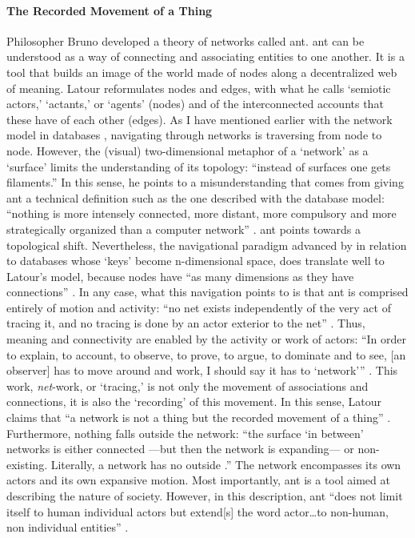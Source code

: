 \paragraph{The Recorded Movement of a Thing}
Philosopher Bruno \textcite{Lat90:On, Lat93:We} developed a theory of networks called \gls{ant}. \gls{ant} can be understood as a way of connecting and associating entities to one another. It is a tool that builds an image of the world made of nodes along a decentralized web of meaning. Latour reformulates nodes and edges, with what he calls `semiotic actors,' `actants,' or `agents' (nodes) and of the interconnected accounts that these have of each other (edges). As I have mentioned earlier with the network model in databases , navigating through networks is traversing from node to node. However, the (visual) two-dimensional metaphor of a `network' as a `surface' limits the understanding of its topology: ``instead of surfaces one gets filaments.'' \parencite[3]{Lat90:On} In this sense, he points to a misunderstanding that comes from giving \gls{ant} a technical definition such as the one described with the database model: ``nothing is more intensely connected, more distant, more compulsory and more strategically organized than a computer network'' \parencite[2]{Lat90:On}. \gls{ant} points towards a topological shift. Nevertheless, the navigational paradigm advanced by \textcite{Bachman:1973:PN:355611.362534} in relation to databases whose `keys' become n-dimensional space, does translate well to Latour's model, because nodes have ``as many dimensions as they have connections'' \parencite[3]{Lat90:On}. In any case, what this navigation points to is that \gls{ant} is comprised entirely of motion and activity: ``no net exists independently of the very act of tracing it, and no tracing is done by an actor exterior to the net'' \parencite[14]{Lat90:On}. Thus, meaning and connectivity are enabled by the activity or work of actors: ``In order to explain, to account, to observe, to prove, to argue, to dominate and to see, [an observer] has to move around and work, I should say it has to `network''' \parencite[13]{Lat90:On}. This work, \textit{net}-work, or `tracing,' is not only the movement of associations and connections, it is also the `recording' of this movement. In this sense, Latour claims that ``a network is not a thing but the recorded movement of a thing'' \parencite[14]{Lat90:On}. Furthermore, nothing falls outside the network: ``the surface `in between' networks is either connected ---but then the network is expanding--- or non-existing. Literally, a network has no outside \parencite[6]{Lat90:On}.'' The network encompasses its own actors and its own expansive motion. Most importantly, \gls{ant} is a tool aimed at describing the nature of society. However, in this description, \gls{ant} ``does not limit itself to human individual actors but extend[s] the word actor\dots to non-human, non individual entities'' \parencite[2]{Lat90:On}.

